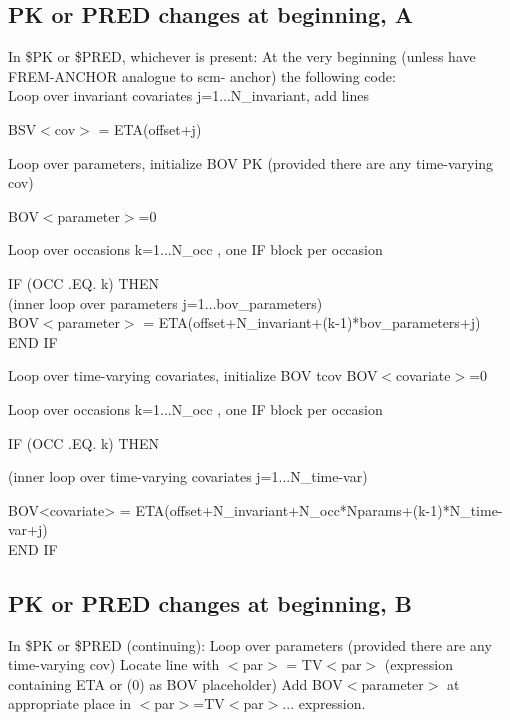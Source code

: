 \subsection{PK or PRED changes at beginning, A}
In \$PK or \$PRED, whichever is present:
At the very beginning (unless have FREM-ANCHOR analogue to scm- anchor) the following code: \\
Loop over invariant covariates j=1...N\_invariant, add lines

\noindent BSV$<$cov$>$ = ETA(offset+j)

\noindent Loop over parameters, initialize BOV PK (provided there are any time-varying cov)

\noindent BOV$<$parameter$>$=0

\noindent Loop over occasions k=1...N\_occ , one IF block per occasion

\noindent IF (OCC .EQ. k) THEN\\
(inner loop over parameters j=1$\ldots$bov\_parameters)\\
BOV$<$parameter$>$ = ETA(offset+N\_invariant+(k-1)*bov\_parameters+j)\\
END IF

\noindent Loop over time-varying covariates, initialize BOV tcov
BOV$<$covariate$>$=0

\noindent Loop over occasions k=1...N\_occ , one IF block per occasion

IF (OCC .EQ. k) THEN

\noindent (inner loop over time-varying covariates j=1...N\_time-var)

\noindent BOV<covariate> = ETA(offset+N\_invariant+N\_occ*Nparams+(k-1)*N\_time-var+j)\\
END IF

\subsection{PK or PRED changes at beginning, B}
In \$PK or \$PRED (continuing):
Loop over parameters (provided there are any time-varying cov)
Locate line with 
$<$par$>$ = TV$<$par$>$ (expression containing ETA or (0) as BOV placeholder)
Add BOV$<$parameter$>$ at appropriate place in $<$par$>$=TV$<$par$>$... expression.

